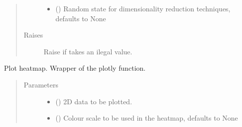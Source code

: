 \documentclass[letterpaper,10pt,english]{sphinxmanual}
\begin{document}
\begin{fulllineitems}
\begin{quote}
\begin{description}
\begin{itemize}
\item {} 
 (\sphinxstyleliteralemphasis{\sphinxupquote{, }}) \textendash{} Random state for dimensionality reduction techniques,
defaults to None

\end{itemize}

\item[{Raises}] \leavevmode
{} \textendash{} Raise  if  takes an
ilegal value.

\end{description}\end{quote}

\end{fulllineitems}


\begin{fulllineitems}
\label{\detokenize{code:code_utils.plotter.plot_heatmap}}
Plot heatmap. Wrapper of the plotly  function.
\begin{quote}\begin{description}
\item[{Parameters}] \leavevmode\begin{itemize}
\item {} 
 () \textendash{} 2D data to be plotted.

\item {} 
 (\sphinxstyleliteralemphasis{\sphinxupquote{, }}) \textendash{} Colour scale to be used in the heatmap,
defaults to None

\end{itemize}

\end{description}\end{quote}

\end{fulllineitems}
\end{document}
